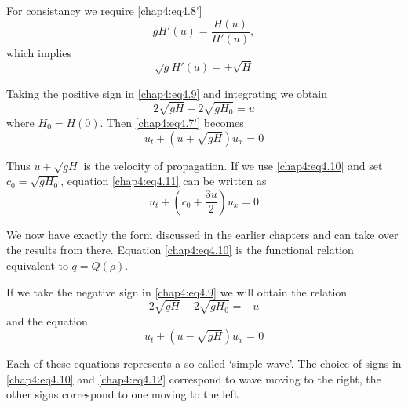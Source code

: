 For consistancy we require \ref{chap4:eq4.8'}
$$
gH'(u)=\frac{H(u)}{H'(u)},
$$
which implies
\begin{equation}
\sqrt{g}H'(u)=\pm\sqrt{H}\tag{4.9}\label{chap4:eq4.9}
\end{equation}

Taking the positive sign in \eqref{chap4:eq4.9} and integrating we obtain
\begin{equation}
2\sqrt{gH}-2\sqrt{gH_0}=u\tag{4.10}\label{chap4:eq4.10}
\end{equation}
where $H_0=H(0)$. Then \ref{chap4:eq4.7'} becomes
\begin{equation}
u_t+\left(u+\sqrt{gH}\right)u_x=0\tag{4.11}\label{chap4:eq4.11}
\end{equation}

Thus $u+\sqrt{gH}$ is the velocity of propagation. If we use \eqref{chap4:eq4.10} and set $c_0=\sqrt{gH_0}$, equation \eqref{chap4:eq4.11} can be written as 
\begin{equation}
u_t+\left(c_0+\frac{3u}{2}\right)u_x=0\tag{4.12}\label{chap4:eq4.12}
\end{equation}

We now have exactly the form discussed in the earlier chapters and can take over the results from there. Equation \eqref{chap4:eq4.10} is the functional relation equivalent to $q=Q(\rho)$. 

If we take the negative sign in \eqref{chap4:eq4.9} we will obtain the relation
$$
2\sqrt{gH}-2\sqrt{gH_0}= -u
$$\pageoriginale
and the equation
$$
u_t+\left(u-\sqrt{gH}\right)u_x=0
$$

Each of these equations represents a so called `simple wave'. The choice of signs in \eqref{chap4:eq4.10} and \eqref{chap4:eq4.12} correspond to wave moving to the right, the other signs correspond to one moving to the left.

